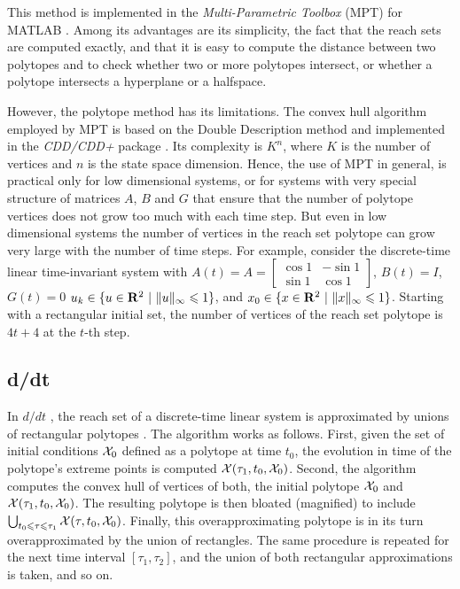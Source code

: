 This method is implemented in the \emph{Multi-Parametric Toolbox} (MPT) for
MATLAB \cite{morari04, mpt}.
Among its advantages are its simplicity, the fact that the reach sets
are computed exactly, and that it is easy to compute the distance between
two polytopes and to check whether two or more polytopes intersect, or whether
a polytope intersects a hyperplane or a halfspace.

However, the polytope method has its limitations.
The convex hull algorithm employed by MPT is based on the Double Description
method \cite{motzkin} and implemented in the \emph{CDD/CDD+} package \cite{cdd}.
Its complexity is $K^n$, where $K$ is the number of vertices and $n$ is the
state space dimension.
Hence, the use of MPT in general, is practical only for low dimensional systems,
or for systems with very special structure of matrices $A$, $B$ and $G$ that
ensure that the number of polytope vertices does not grow too much
with each time step.
But even in low dimensional systems the number of vertices in the reach set
polytope can grow very large with the number of time steps.
For example, consider the discrete-time linear time-invariant system
with $A(t)=A=\left[\begin{array}{cc}
\cos 1 & -\sin 1\\
\sin 1 & \cos 1\end{array}\right]$, $B(t)=I$, $G(t)=0$
$u_k \in \{u\in {\bf R}^2 ~|~ \|u\|_{\infty}\leq 1\}$, and
$x_0 \in \{x\in {\bf R}^2 ~|~ \|x\|_{\infty}\leq 1\}$.
Starting with a rectangular initial set, the number of vertices
of the reach set polytope is $4t + 4$ at the $t$-th step.












\subsection{d/dt}\label{subsec_ddt}
In $d/dt$ \cite{ddt}, the reach set of a discrete-time linear system
is approximated by unions of rectangular polytopes \cite{maler00}.
The algorithm works as follows.
First, given the set of initial conditions $\XX_0$ defined as a polytope
at time $t_0$, the evolution in time of the polytope's extreme points
is computed $\XX(\tau_1, t_0, \XX_0)$.
Second, the algorithm computes the convex hull of vertices of both,
the initial polytope $\XX_0$ and $\XX(\tau_1, t_0, \XX_0)$.
The resulting polytope is then bloated (magnified) to include
$\bigcup_{t_0\leq\tau\leq\tau_1}\XX(\tau, t_0, \XX_0)$.
Finally, this overapproximating polytope is in its
turn overapproximated by the union of rectangles.
The same procedure is repeated for the next time interval $[\tau_1, \tau_2]$,
and the union of both rectangular approximations is taken, and so on.

